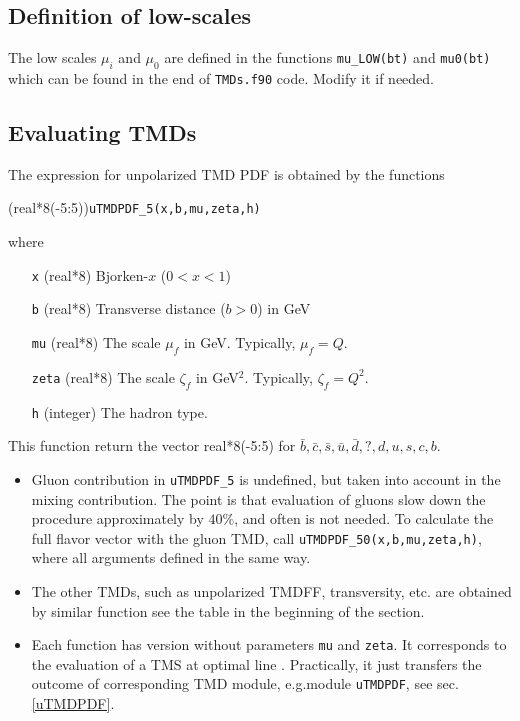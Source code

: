 \documentclass[prd,nofootinbib,eqsecnum,final]{revtex4}
\renewcommand{\(}{\left(}
\renewcommand{\)}{\right)}
\renewcommand{\[}{\left[}
\renewcommand{\]}{\right]}
\begin{document}
\subsection{Definition of low-scales}
\label{TMDs:mus}

The low scales $\mu_i$ and $\mu_0$ are defined in the functions \texttt{mu{\_}LOW(bt)} and \texttt{mu0(bt)} which can be found in the end of \texttt{TMDs.f90} code. Modify it if needed.



\subsection{Evaluating TMDs}
\label{TMDs:TMDs}

The expression for unpolarized TMD PDF is obtained by the functions

(real*8(-5:5))\texttt{uTMDPDF{\_}5(x,b,mu,zeta,h)}

where 
\begin{itemize}
\item [\texttt{x}] (real*8) Bjorken-$x$ ($0<x<1$)
\item [\texttt{b}] (real*8) Transverse distance ($b>0$) in GeV
\item [\texttt{mu}] (real*8) The scale $\mu_f$ in GeV. Typically, $\mu_f=Q$.
\item [\texttt{zeta}] (real*8) The scale $\zeta_f$ in GeV$^2$. Typically, $\zeta_f=Q^2$.
\item [\texttt{h}] (integer) The hadron type.
\end{itemize}
This function return the vector real*8(-5:5) for $\bar b, \bar c, \bar s,\bar u,\bar d ,?,d,u,s, c, b$.

\begin{itemize}
\item Gluon contribution in \texttt{uTMDPDF{\_}5} is undefined, but taken into account in the mixing contribution. The point is that evaluation of gluons slow down the procedure approximately by $40\%$, and often is not needed. To calculate the full flavor vector with the gluon TMD, call \texttt{uTMDPDF{\_}50(x,b,mu,zeta,h)}, where all arguments defined in the same way.

\item The other TMDs, such as unpolarized TMDFF, transversity, etc. are obtained by similar function see the table in the beginning of the section.

\item Each function has version without parameters \texttt{mu} and \texttt{zeta}. It corresponds to the evaluation of a TMS at optimal line \cite{Scimemi:2018xaf}. Practically, it just transfers the outcome of corresponding TMD module, e.g.module \texttt{uTMDPDF}, see sec.\ref{uTMDPDF}.
\end{itemize}
\end{document}
